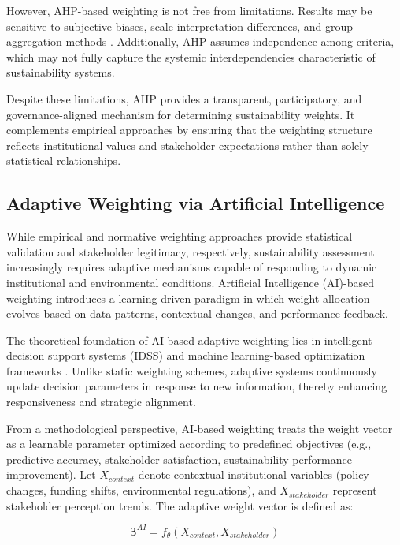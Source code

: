 \documentclass[11pt,a4paper]{article}
\begin{document}
However, AHP-based weighting is not free from limitations. Results may be sensitive to subjective biases, scale interpretation differences, and group aggregation methods \cite{Greco2019}. Additionally, AHP assumes independence among criteria, which may not fully capture the systemic interdependencies characteristic of sustainability systems.

Despite these limitations, AHP provides a transparent, participatory, and governance-aligned mechanism for determining sustainability weights. It complements empirical approaches by ensuring that the weighting structure reflects institutional values and stakeholder expectations rather than solely statistical relationships.
\subsection{Adaptive Weighting via Artificial Intelligence}

While empirical and normative weighting approaches provide statistical validation and stakeholder legitimacy, respectively, sustainability assessment increasingly requires adaptive mechanisms capable of responding to dynamic institutional and environmental conditions. Artificial Intelligence (AI)-based weighting introduces a learning-driven paradigm in which weight allocation evolves based on data patterns, contextual changes, and performance feedback.

The theoretical foundation of AI-based adaptive weighting lies in intelligent decision support systems (IDSS) and machine learning-based optimization frameworks \cite{Lu2019,Yu2015}. Unlike static weighting schemes, adaptive systems continuously update decision parameters in response to new information, thereby enhancing responsiveness and strategic alignment.

From a methodological perspective, AI-based weighting treats the weight vector as a learnable parameter optimized according to predefined objectives (e.g., predictive accuracy, stakeholder satisfaction, sustainability performance improvement). Let $X_{context}$ denote contextual institutional variables (policy changes, funding shifts, environmental regulations), and $X_{stakeholder}$ represent stakeholder perception trends. The adaptive weight vector is defined as:

\begin{equation}
\boldsymbol{\beta}^{AI} = f_{\theta}(X_{context}, X_{stakeholder})
\end{equation}
\end{document}
